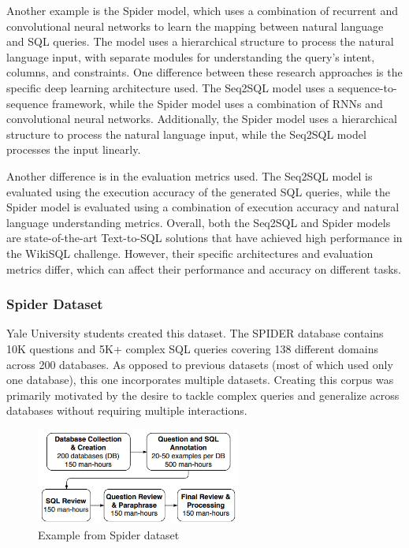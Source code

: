 Another example is the Spider model, which uses a combination of recurrent and convolutional neural networks to learn the mapping between natural language and SQL queries. The model uses a hierarchical structure to process the natural language input, with separate modules for understanding the query's intent, columns, and constraints.
One difference between these research approaches is the specific deep learning architecture used. The Seq2SQL model uses a sequence-to-sequence framework, while the Spider model uses a combination of RNNs and convolutional neural networks. Additionally, the Spider model uses a hierarchical structure to process the natural language input, while the Seq2SQL model processes the input linearly.

Another difference is in the evaluation metrics used. The Seq2SQL model is evaluated using the execution accuracy of the generated SQL queries, while the Spider model is evaluated using a combination of execution accuracy and natural language understanding metrics.
Overall, both the Seq2SQL and Spider models are state-of-the-art Text-to-SQL solutions that have achieved high performance in the WikiSQL challenge. However, their specific architectures and evaluation metrics differ, which can affect their performance and accuracy on different tasks.

\subsubsection{Spider Dataset}

Yale University students created this dataset.
The SPIDER database contains 10K questions and 5K+ complex SQL queries covering 138 different domains across 200 databases. As opposed to previous datasets (most of which used only one database), this one incorporates multiple datasets. Creating this corpus was primarily motivated by the desire to tackle complex queries and generalize across databases without requiring multiple interactions.

\begin{figure}[htb]
    \centering
    \includegraphics[width=0.6\textwidth]{pics/db/Spider.png}
    \caption{Example from Spider dataset\cite{yu_spider_2019}}
    \label{fig:Spider}
\end{figure}

